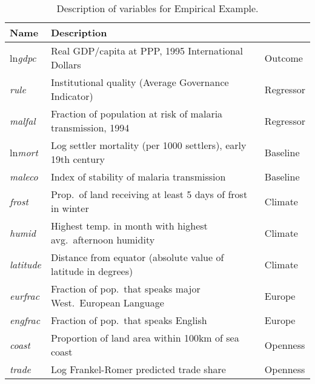 \begin{table}[!tbp]
\small
\centering
\begin{tabular}{lll}
\hline \hline
Name& Description &\\
\hline
ln\emph{gdpc}&Real GDP/capita at PPP, 1995 International Dollars &Outcome\\
\emph{rule}&Institutional quality (Average Governance Indicator)&Regressor\\
\emph{malfal}&Fraction of population at risk of malaria transmission, 1994&Regressor\\
ln\emph{mort}&Log settler mortality (per 1000 settlers), early 19th century&Baseline\\
\emph{maleco}&Index of stability of malaria transmission&Baseline\\
\emph{frost}&Prop.\ of land receiving at least 5 days of frost in winter&Climate\\
\emph{humid}&Highest temp. in month with highest avg.\ afternoon humidity&Climate\\
\emph{latitude}&Distance from equator (absolute value of latitude in degrees)&Climate \\
\emph{eurfrac}&Fraction of pop.\ that speaks major West.\ European Language&Europe \\
\emph{engfrac}&Fraction of pop.\ that speaks English&Europe\\
\emph{coast}&Proportion of land area within 100km of sea coast&Openness\\
\emph{trade}&Log Frankel-Romer predicted trade share&Openness\\
\hline
\end{tabular}
\caption{Description of variables for Empirical Example.}
\label{tab:desc}
\end{table}

